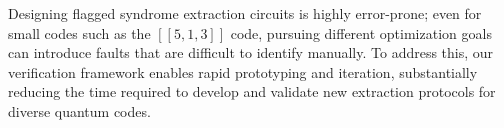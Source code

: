 \documentclass[acmsmallw,review]{acmart}
\begin{document}
Designing flagged syndrome extraction circuits is highly error-prone; even for small codes such as the $[[5,1,3]]$ code, pursuing different optimization goals can introduce faults that are difficult to identify manually. To address this, our verification framework enables rapid prototyping and iteration, substantially reducing the time required to develop and validate new extraction protocols for diverse quantum codes.
\begin{figure}[h]
\centering

\begin{subfigure}{0.48\linewidth}
\centering
{}
\caption{}
\label{fig:left-circuit-ld}
\end{subfigure}%
\hfill
\begin{subfigure}{0.48\linewidth}
\centering
\scalebox{0.7}{
\begin{quantikz}[row sep={1cm,between origins}, column sep=0.45cm]

\end{quantikz}}
\end{subfigure}
\end{figure}
\end{document}
